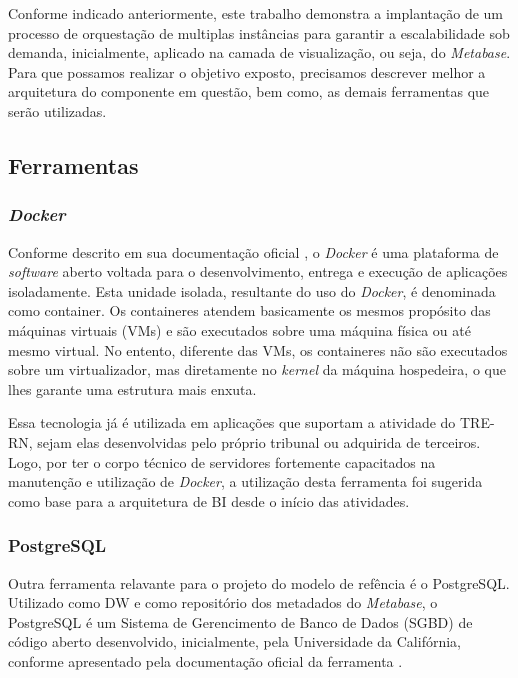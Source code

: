 Conforme indicado anteriormente, este trabalho demonstra a implantação de um processo de orquestação de multiplas instâncias para garantir a escalabilidade sob demanda, inicialmente, aplicado na camada de visualização, ou seja, do \textit{Metabase}. Para que possamos realizar o objetivo exposto, precisamos descrever melhor a arquitetura do componente em questão, bem como, as demais ferramentas que serão utilizadas. 

\subsection{Ferramentas}

\subsubsection{\textit{Docker}}

Conforme descrito em sua documentação oficial \cite{dockerDoc}, o \textit{Docker} é uma plataforma de \textit{software} aberto voltada para o desenvolvimento, entrega e execução de aplicações isoladamente. Esta unidade isolada, resultante do uso do \textit{Docker}, é denominada como container. Os containeres atendem basicamente os mesmos propósito das máquinas virtuais (VMs) e são executados sobre uma máquina física ou até mesmo virtual. No entento, diferente das VMs, os containeres não são executados sobre um virtualizador, mas diretamente no \textit{kernel} da máquina hospedeira, o que lhes garante uma estrutura mais enxuta.

Essa tecnologia já é utilizada em aplicações que suportam a atividade do TRE-RN, sejam elas desenvolvidas pelo próprio tribunal ou adquirida de terceiros. Logo, por ter o corpo técnico de servidores fortemente capacitados na manutenção e utilização de \textit{Docker}, a utilização desta ferramenta foi sugerida como base para a arquitetura de BI desde o início das atividades.

\subsubsection{PostgreSQL}

Outra ferramenta relavante para o projeto do modelo de refência é o PostgreSQL. Utilizado como DW e como repositório dos metadados do \textit{Metabase}, o PostgreSQL é um Sistema de Gerencimento de Banco de Dados (SGBD) de código aberto desenvolvido, inicialmente, pela Universidade da Califórnia, conforme apresentado pela documentação oficial da ferramenta \cite{postgresDoc}.

